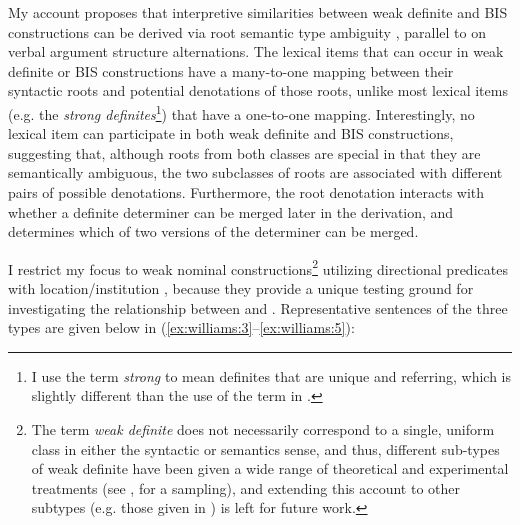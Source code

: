 \documentclass[output=paper,
modfonts
]{langscibook}
\begin{document}
My account proposes that interpretive similarities between weak definite and BIS constructions can be derived via root semantic type ambiguity \citep[see][]{RappaportLevin1998}, parallel to \citet{Levinson2014} on verbal argument structure alternations. The lexical items that can occur in weak definite or BIS constructions have a many-to-one mapping between their syntactic roots and potential denotations of those roots, unlike most lexical items (e.g. the \textit{strong definites}\footnote{I use the term \textit{strong} to mean definites that are unique and referring, which is slightly different than the use of the term in \citet{Schwarz2009,Schwarz2013}.}) that have a one-to-one mapping. Interestingly, no lexical item can participate in both weak definite and BIS constructions, suggesting that, although roots from both classes are special in that they are semantically ambiguous, the two subclasses of roots are associated with different pairs of possible denotations. Furthermore, the root denotation interacts with whether a definite determiner can be merged later in the derivation, and determines which of two versions of the determiner can be merged.\newpage

I restrict my focus to weak nominal constructions\footnote{The term \textit{weak definite} does not necessarily correspond to a single, uniform class in either the syntactic or semantics sense, and thus, different sub-types of weak definite have been given a wide range of theoretical and experimental treatments (see \citealt{Barker2005,KleinEtAlii2009,Aguilar-GuevaraZwarsts2011,Klein2011,Aguilar-GuevaraSchulpen2014,Schwarz2014}, for a sampling), and extending this account to other subtypes (e.g. those given in \citealt{stvan1998}) is left for future work.} utilizing directional predicates with location/institution , because they provide a unique testing ground for investigating the relationship between  and . Representative sentences of the three types are given below in (\ref{ex:williams:3}--\ref{ex:williams:5}):

\begin{exe}
\end{exe}
\end{document}
